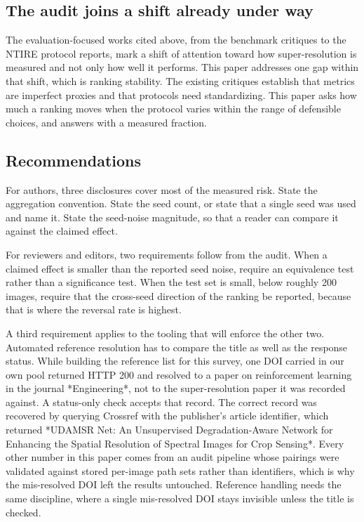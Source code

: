 \documentclass{interact}
\begin{document}
\subsection{The audit joins a shift already under way}\label{sec:shift}

The evaluation-focused works cited above, from the benchmark critiques to the NTIRE protocol reports, mark a shift of attention toward how super-resolution is measured and not only how well it performs. This paper addresses one gap within that shift, which is ranking stability. The existing critiques establish that metrics are imperfect proxies and that protocols need standardizing. This paper asks how much a ranking moves when the protocol varies within the range of defensible choices, and answers with a measured fraction.

\subsection{Recommendations}\label{sec:recommend}

For authors, three disclosures cover most of the measured risk. State the aggregation convention. State the seed count, or state that a single seed was used and name it. State the seed-noise magnitude, so that a reader can compare it against the claimed effect.

For reviewers and editors, two requirements follow from the audit. When a claimed effect is smaller than the reported seed noise, require an equivalence test rather than a significance test. When the test set is small, below roughly 200 images, require that the cross-seed direction of the ranking be reported, because that is where the reversal rate is highest.

A third requirement applies to the tooling that will enforce the other two. Automated reference resolution has to compare the title as well as the response status. While building the reference list for this survey, one DOI carried in our own pool returned HTTP 200 and resolved to a paper on reinforcement learning in the journal *Engineering*, not to the super-resolution paper it was recorded against. A status-only check accepts that record. The correct record was recovered by querying Crossref with the publisher's article identifier, which returned *UDAMSR Net: An Unsupervised Degradation-Aware Network for Enhancing the Spatial Resolution of Spectral Images for Crop Sensing*. Every other number in this paper comes from an audit pipeline whose pairings were validated against stored per-image path sets rather than identifiers, which is why the mis-resolved DOI left the results untouched. Reference handling needs the same discipline, where a single mis-resolved DOI stays invisible unless the title is checked.
\end{document}
